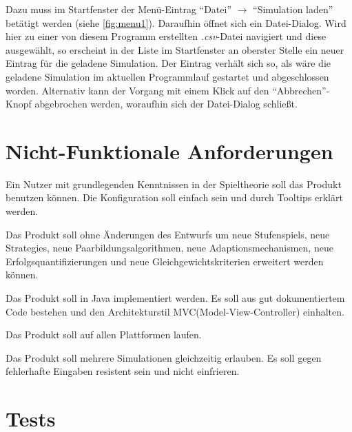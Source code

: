 \documentclass[parskip=full,11pt]{scrartcl}
\begin{document}
Dazu muss im Startfenster der Menü-Eintrag \enquote{Datei} \(\rightarrow\) \enquote{Simulation laden} betätigt werden (siehe \cref{fig:menu1}). Daraufhin öffnet sich ein Datei-Dialog. Wird hier zu einer von diesem Programm erstellten \textit{.csv}-Datei navigiert und diese ausgewählt, so erscheint in der Liste im Startfenster an oberster Stelle ein neuer Eintrag für die geladene Simulation. Der Eintrag verhält sich so, als wäre die geladene Simulation im aktuellen Programmlauf gestartet und abgeschlossen worden. Alternativ kann der Vorgang mit einem Klick auf den \enquote{Abbrechen}-Knopf abgebrochen werden, woraufhin sich der Datei-Dialog schließt.

\section{Nicht-Funktionale Anforderungen}


Ein \Gls{Nutzer} mit grundlegenden Kenntnissen in der Spieltheorie soll das Produkt benutzen können. Die \Gls{Konfiguration} soll einfach sein und durch Tooltips erklärt werden.


Das Produkt soll ohne Änderungen des Entwurfs um neue \Glspl{Stufenspiel}, neue \Glspl{Strategie}, neue Paarbildungsalgorithmen, neue Adaptionsmechanismen, neue Erfolgsquantifizierungen und neue Gleichgewichtskriterien erweitert werden können.


Das Produkt soll in Java implementiert werden. Es soll aus gut dokumentiertem Code bestehen und den Architekturstil MVC(Model-View-Controller) einhalten.


Das Produkt soll auf allen Plattformen laufen.


Das Produkt soll mehrere Simulationen gleichzeitig erlauben. Es soll gegen fehlerhafte Eingaben resistent sein und nicht einfrieren.

\section{Tests}
\end{document}
